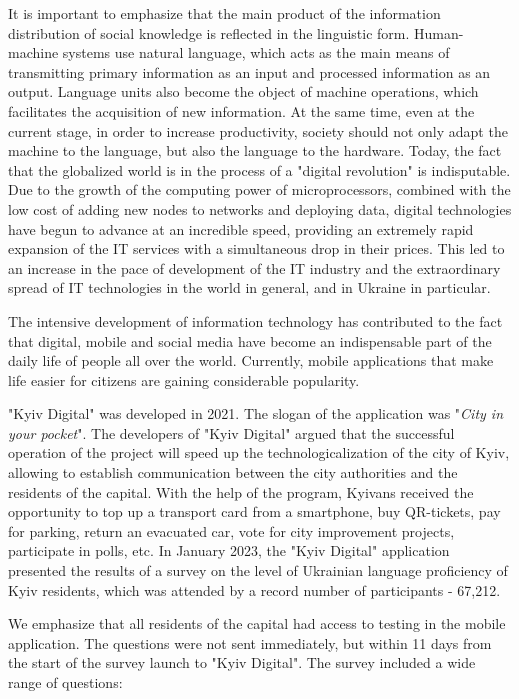 \documentclass[english]{textolivre}
\begin{document}
It is important to emphasize that the main product of the information distribution of social knowledge is reflected in the linguistic form. Human-machine systems use natural language, which acts as the main means of transmitting primary information as an input and processed information as an output. Language units also become the object of machine operations, which facilitates the acquisition of new information. At the same time, even at the current stage, in order to increase productivity, society should not only adapt the machine to the language, but also the language to the hardware. Today, the fact that the globalized world is in the process of a "digital revolution" is indisputable. Due to the growth of the computing power of microprocessors, combined with the low cost of adding new nodes to networks and deploying data, digital technologies have begun to advance at an incredible speed, providing an extremely rapid expansion of the IT services with a simultaneous drop in their prices. This led to an increase in the pace of development of the IT industry and the extraordinary spread of IT technologies in the world in general, and in Ukraine in particular.

The intensive development of information technology has contributed to the fact that digital, mobile and social media have become an indispensable part of the daily life of people all over the world. Currently, mobile applications that make life easier for citizens are gaining considerable popularity.

"Kyiv Digital" was developed in 2021. The slogan of the application was "\emph{City in your pocket}". The developers of "Kyiv Digital" argued that the successful operation of the project will speed up the technologicalization of the city of Kyiv, allowing to establish communication between the city authorities and the residents of the capital. With the help of the program, Kyivans received the opportunity to top up a transport card from a smartphone, buy QR-tickets, pay for parking, return an evacuated car, vote for city improvement projects, participate in polls, etc. In January 2023, the "Kyiv Digital" application presented the results of a survey on the level of Ukrainian language proficiency of Kyiv residents, which was attended by a record number of participants - 67,212. 

We emphasize that all residents of the capital had access to testing in the mobile application. The questions were not sent immediately, but within 11 days from the start of the survey launch to "Kyiv Digital". The survey included a wide range of questions:
\end{document}
